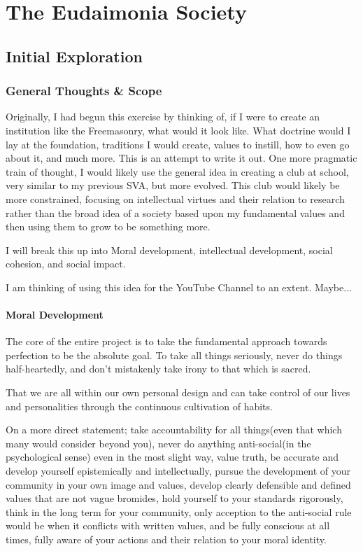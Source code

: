 \chapter{The Eudaimonia Society}

\section{Initial Exploration}

\subsection{General Thoughts \& Scope}
Originally, I had begun this exercise by thinking of, if I were to create an institution like the Freemasonry, what would it look like. What doctrine would I lay at the foundation, traditions I would create, values to instill, how to even go about it, and much more. This is an attempt to write it out. One more pragmatic train of thought, I would likely use the general idea in creating a club at school, very similar to my previous SVA, but more evolved. This club would likely be more constrained, focusing on intellectual virtues and their relation to research rather than the broad idea of a society based upon my fundamental values and then using them to grow to be something more.

I will break this up into Moral development, intellectual development, social cohesion, and social impact.

I am thinking of using this idea for the YouTube Channel to an extent. Maybe...

\subsubsection{Moral Development}
The core of the entire project is to take the fundamental approach towards perfection to be the absolute goal. To take all things seriously, never do things half-heartedly, and don't mistakenly take irony to that which is sacred.

That we are all within our own personal design and can take control of our lives and personalities through the continuous cultivation of habits.

On a more direct statement; take accountability for all things(even that which many would consider beyond you), never do anything anti-social(in the psychological sense) even in the most slight way, value truth, be accurate and develop yourself epistemically and intellectually, pursue the development of your community in your own image and values, develop clearly defensible and defined values that are not vague bromides, hold yourself to your standards rigorously, think in the long term for your community, only acception to the anti-social rule would be when it conflicts with written values, and be fully conscious at all times, fully aware of your actions and their relation to your moral identity.

